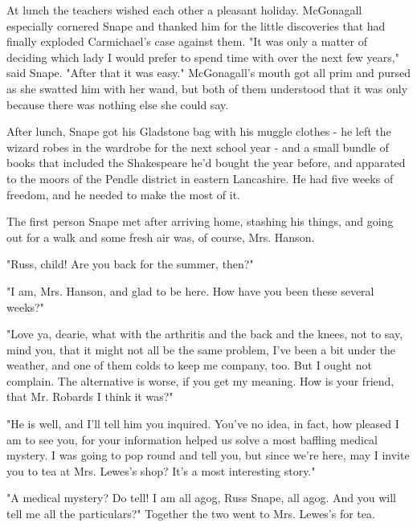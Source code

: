 At lunch the teachers wished each other a pleasant holiday. McGonagall especially cornered Snape and thanked him for the little discoveries that had finally exploded Carmichael's case against them. "It was only a matter of deciding which lady I would prefer to spend time with over the next few years," said Snape. "After that it was easy." McGonagall's mouth got all prim and pursed as she swatted him with her wand, but both of them understood that it was only because there was nothing else she could say.

After lunch, Snape got his Gladstone bag with his muggle clothes - he left the wizard robes in the wardrobe for the next school year - and a small bundle of books that included the Shakespeare he'd bought the year before, and apparated to the moors of the Pendle district in eastern Lancashire. He had five weeks of freedom, and he needed to make the most of it.

The first person Snape met after arriving home, stashing his things, and going out for a walk and some fresh air was, of course, Mrs. Hanson.

"Russ, child! Are you back for the summer, then?"

"I am, Mrs. Hanson, and glad to be here. How have you been these several weeks?"

"Love ya, dearie, what with the arthritis and the back and the knees, not to say, mind you, that it might not all be the same problem, I've been a bit under the weather, and one of them colds to keep me company, too. But I ought not complain. The alternative is worse, if you get my meaning. How is your friend, that Mr. Robards I think it was?"

"He is well, and I'll tell him you inquired. You've no idea, in fact, how pleased I am to see you, for your information helped us solve a most baffling medical mystery. I was going to pop round and tell you, but since we're here, may I invite you to tea at Mrs. Lewes's shop? It's a most interesting story."

"A medical mystery? Do tell! I am all agog, Russ Snape, all agog. And you will tell me all the particulars?" Together the two went to Mrs. Lewes's for tea.


